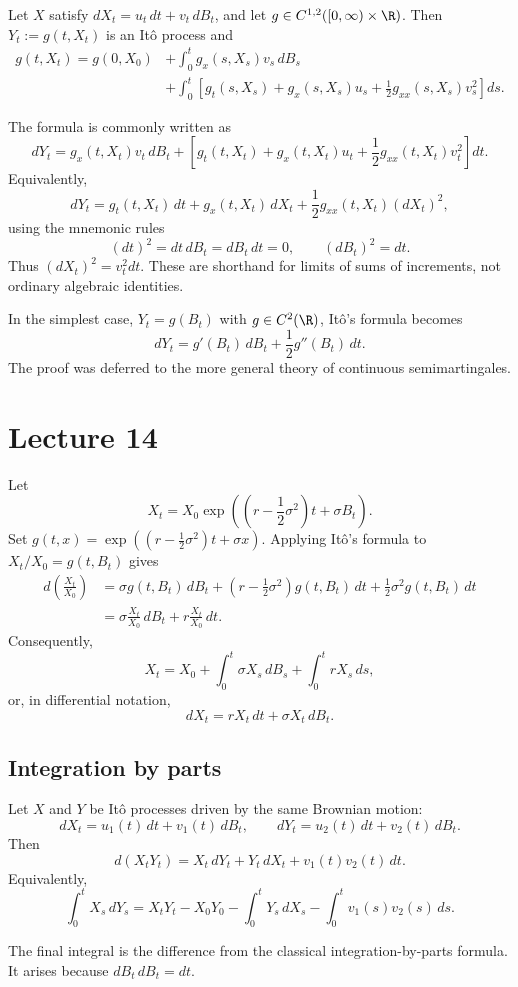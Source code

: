 \begin{theorem}
Let $X$ satisfy $dX_t=u_t\,dt+v_t\,dB_t$, and let
$g\in C^{1,2}([0,\infty)\times\R)$. Then
$Y_t:=g(t,X_t)$ is an It\^o process and
\[
 \begin{aligned}
 g(t,X_t)=g(0,X_0)
 &+\int_0^t g_x(s,X_s)v_s\,dB_s\\
 &+\int_0^t\left[g_t(s,X_s)+g_x(s,X_s)u_s
 +\frac12g_{xx}(s,X_s)v_s^2\right]ds.
 \end{aligned}
\]
\end{theorem}

\begin{remark}
The formula is commonly written as
\[
 dY_t=g_x(t,X_t)v_t\,dB_t+
 \left[g_t(t,X_t)+g_x(t,X_t)u_t
 +\frac12g_{xx}(t,X_t)v_t^2\right]dt.
\]
Equivalently,
\[
 dY_t=g_t(t,X_t)\,dt+g_x(t,X_t)\,dX_t
 +\frac12g_{xx}(t,X_t)(dX_t)^2,
\]
using the mnemonic rules
\[
 (dt)^2=dt\,dB_t=dB_t\,dt=0,\qquad(dB_t)^2=dt.
\]
Thus $(dX_t)^2=v_t^2dt$. These are shorthand for limits of sums of
increments, not ordinary algebraic identities.
\end{remark}

In the simplest case, $Y_t=g(B_t)$ with $g\in C^2(\R)$, It\^o's formula
becomes
\[
 dY_t=g'(B_t)\,dB_t+\frac12g''(B_t)\,dt.
\]
The proof was deferred to the more general theory of continuous
semimartingales.
\section{Lecture 14}

\begin{example}
Let
\[
 X_t=X_0\exp\!\left(\left(r-\frac12\sigma^2\right)t+\sigma B_t\right).
\]
Set $g(t,x)=\exp((r-\tfrac12\sigma^2)t+\sigma x)$. Applying It\^o's
formula to $X_t/X_0=g(t,B_t)$ gives
\[
 \begin{aligned}
 d\left(\frac{X_t}{X_0}\right)
 &=\sigma g(t,B_t)\,dB_t
 +\left(r-\frac12\sigma^2\right)g(t,B_t)\,dt
 +\frac12\sigma^2g(t,B_t)\,dt\\
 &=\sigma\frac{X_t}{X_0}\,dB_t+r\frac{X_t}{X_0}\,dt.
 \end{aligned}
\]
Consequently,
\[
 X_t=X_0+\int_0^t\sigma X_s\,dB_s+\int_0^t rX_s\,ds,
\]
or, in differential notation,
\[
 dX_t=rX_t\,dt+\sigma X_t\,dB_t.
\]
\end{example}

\subsection*{Integration by parts}
\begin{theorem}
Let $X$ and $Y$ be It\^o processes driven by the same Brownian motion:
\[
 dX_t=u_1(t)\,dt+v_1(t)\,dB_t,
 \qquad dY_t=u_2(t)\,dt+v_2(t)\,dB_t.
\]
Then
\[
 d(X_tY_t)=X_t\,dY_t+Y_t\,dX_t+v_1(t)v_2(t)\,dt.
\]
Equivalently,
\[
 \int_0^tX_s\,dY_s
 =X_tY_t-X_0Y_0-\int_0^tY_s\,dX_s
 -\int_0^t v_1(s)v_2(s)\,ds.
\]
\end{theorem}
The final integral is the difference from the classical integration-by-parts
formula. It arises because $dB_t\,dB_t=dt$.

